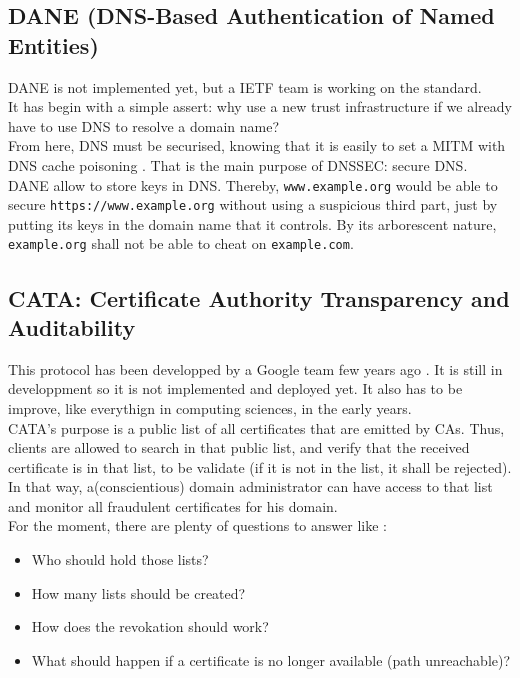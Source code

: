 \documentclass[journal, a4paper]{IEEEtran}
\begin{document}
\subsection{DANE (DNS-Based Authentication of Named Entities)}
\label{dane}

DANE is not implemented yet, but a IETF team is working on the standard.\\
It has begin with a simple assert: why use a new trust infrastructure if we already have to use DNS to resolve a domain name?\\
From here, DNS must be securised, knowing that it is easily to set a MITM with DNS cache poisoning \cite{bor08} \cite{aa04}. That is the main purpose of DNSSEC: secure DNS. DANE allow to store keys in DNS. Thereby, \verb$www.example.org$ would be able to secure \verb$https://www.example.org$ without using a suspicious third part, just by putting its keys in the domain name that it controls. By its arborescent nature, \verb$example.org$ shall not be able to cheat on \verb$example.com$.

\subsection{CATA: Certificate Authority Transparency and Auditability}
\label{certtrans}

This protocol has been developped by a Google team few years ago \cite{LL11}. It is still in developpment \cite{certtransp2013} so it is not implemented and deployed yet. It also has to be improve, like everythign in computing sciences, in the early years.\\
CATA's purpose is a public list of all certificates that are emitted by CAs. Thus, clients are allowed to search in that public list, and verify that the received certificate is in that list, to be validate (if it is not in the list, it shall be rejected).\\
In that way, a(conscientious) domain administrator can have access to that list and monitor all fraudulent certificates for his domain.\\
For the moment, there are plenty of questions to answer like :
\begin{itemize}
	\item Who should hold those lists?
	\item How many lists should be created?
	\item How does the revokation should work?
	\item What should happen if a certificate is no longer available (path unreachable)?
\end{itemize}
\end{document}
